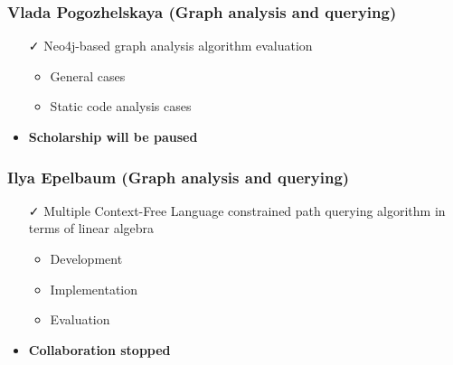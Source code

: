 \documentclass[xcolor=table,aspectratio=169]{beamer}
\begin{document}
\begin{frame}[fragile]
  \frametitle{Vlada Pogozhelskaya (Graph analysis and querying)}
  \begin{minipage}[t]{0.48\textwidth}
    \begin{itemize}
      \item[\faCheck] Neo4j-based graph analysis algorithm evaluation
      \begin{itemize}
        \item General cases
        \item Static code analysis cases
      \end{itemize}  
    \end{itemize}
  \end{minipage}
  \pause
  \begin{minipage}[t]{0.48\textwidth}
    \begin{itemize}
      \item \textbf{Scholarship will be paused}
    \end{itemize}
  \end{minipage}
\end{frame}

\begin{frame}[fragile]
  \frametitle{Ilya Epelbaum (Graph analysis and querying)}
  \begin{minipage}[t]{0.48\textwidth}
    \begin{itemize}
      \item[\faCheck] Multiple Context-Free Language constrained path querying algorithm in terms of linear algebra
      \begin{itemize}
        \item Development
        \item Implementation
        \item Evaluation
      \end{itemize}
    \end{itemize}
  \end{minipage}
  \pause
  \begin{minipage}[t]{0.48\textwidth}
    \begin{itemize}
      \item \textbf{Collaboration stopped}
    \end{itemize}
    
  \end{minipage}
\end{frame}
\end{document}
